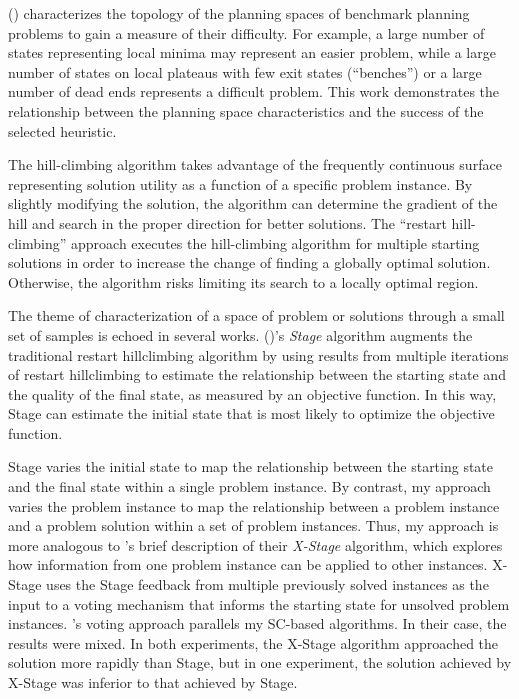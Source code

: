 \citeauthor{hoffmann01local} (\citeyear{hoffmann01local})  characterizes the topology of the planning spaces of benchmark planning problems to gain a  measure of their difficulty.  For example, a large number of states representing local minima may represent an easier problem, while a large number of states on local plateaus with few exit states (``benches'') or a large number of dead ends represents a difficult problem.   This work demonstrates the relationship between the planning space characteristics and the success of the selected heuristic.


The hill-climbing algorithm takes advantage of the frequently continuous surface representing solution utility as a function of a specific problem instance.  By slightly modifying the solution, the algorithm can determine the gradient of the hill and search in the proper direction for better solutions.  The ``restart hill-climbing'' approach executes the hill-climbing algorithm for multiple starting solutions in order to increase the change of finding a globally optimal solution.  Otherwise, the algorithm risks limiting its search to a locally optimal region.


The theme of characterization of a space of problem or solutions through a small set of samples is echoed in several works.  \citeauthor{boyan00learning} (\citeyear{boyan00learning})'s \textit{Stage} algorithm augments the traditional restart hillclimbing algorithm by using results from multiple iterations of restart hillclimbing to estimate the relationship between the starting state and the quality of the final state, as measured by an objective function.  In this way, Stage can estimate the initial state that is most likely to optimize the objective function.  



Stage varies the initial state to map the relationship between the starting state and the final state within a single problem instance.  By contrast, my approach varies the problem instance to map the relationship between a problem instance and a problem solution within a set of problem instances.  Thus, my approach is more analogous to \citeauthor{boyan00learning}'s brief description of their \textit{X-Stage} algorithm, which explores how information from one problem instance can be applied to other instances.  X-Stage uses the Stage feedback from multiple previously solved instances as the input to a voting mechanism that informs the starting state for unsolved problem instances.  \citeauthor{boyan00learning}'s voting approach parallels my SC-based algorithms.  In their case, the results were mixed.  In both experiments, the X-Stage algorithm approached the solution more rapidly than Stage, but in one experiment, the solution achieved by X-Stage was inferior to that achieved by Stage.

